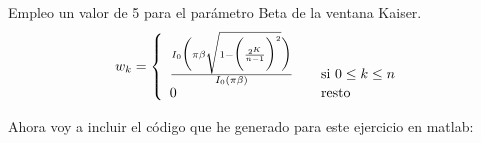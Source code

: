 \documentclass[a4paper,12pt]{article}
\begin{document}
\begin{enumerate}
\begin{itemize}
Empleo un valor de 5 para el parámetro Beta de la ventana Kaiser. \\
\[ w_k = \left\{ 
  \begin{array}{l l}
    \frac{I_0 \bigg(\pi \beta \sqrt{1 - \bigg( \frac{2^K}{n -1} \bigg)^2} \bigg)}{I_0 (\pi \beta)} & \quad \text{si } 0 \leq k \leq n \\
    0 & \quad \text{resto}
  \end{array} \right.\]
\end{itemize}

Ahora voy a incluir el código que he generado para este ejercicio en matlab: \\



\end{enumerate}
\end{document}
